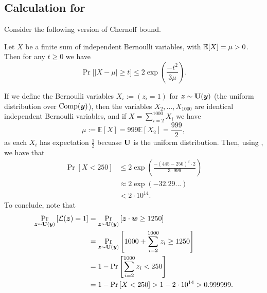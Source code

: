
\subsection{Calculation for~}
Consider the following version of Chernoff bound.
\begin{lemma}
    Let $X$ be a finite sum of independent Bernoulli variables, with $\mathbb{E}[X] = \mu > 0$. Then for any $t \geq 0$ we have
    \[
    \Pr \Big[ \left|X - \mu\right| \geq t \Big] \leq 2\exp\left(\frac{-t^2}{3 \mu} \right).
    \] 
    
    \label{lemma:chernoff}  
    \end{lemma}
If we define the Bernoulli variables $X_i := (z_i = 1)$ for ${\bm{z}} \sim \mathbf{U}({\bm{y}})$ (the uniform distribution over $\operatorname{Comp}({\bm{y}})$), then the variables $X_2, \ldots, X_{1000}$ are identical independent Bernoulli variables, and if $X = \sum_{i = 2}^{1000} X_i$ we have 
\[
    \mu := \mathbb{E}[X] =  999\mathbb{E}[X_2] = \frac{999}{2},
\]
as each $X_i$ has expectation $\frac{1}{2}$ becuase $\mathbf{U}$ is the uniform distribution. Then, using , we have that 
\begin{align*}
    \Pr\left[ X < 250 \right] &\leq 2 \exp\left(\frac{-(445-250)^2    \cdot 2}{3 \cdot 999}\right)\\ &\approx 2 \exp(-32.29...)\\ &< 2 \cdot 10^{14}.
\end{align*}
To conclude, note that
\begin{align*}
    \Pr_{{\bm{z}} \sim \mathbf{U}({\bm{y}})}
     \left[\mathcal{L}({\bm{z}}) = 1 \right] 
      &= \Pr_{{\bm{z}} \sim \mathbf{U}({\bm{y}})}
    \left[{\bm{z}} \cdot {\bm{w}} \geq 1250 \right]\\
    &= \Pr_{{\bm{z}} \sim \mathbf{U}({\bm{y}})}\left[1000 + \sum_{i=2}^{1000}{z_i} \geq 1250\right]\\
    &= 1 - \Pr\left[\sum_{i=2}^{1000}{z_i} < 250\right]\\
    &= 1 - \Pr\left[ X < 250 \right] > 1 - 2\cdot 10^{14} > 0.999999.
\end{align*}
    


